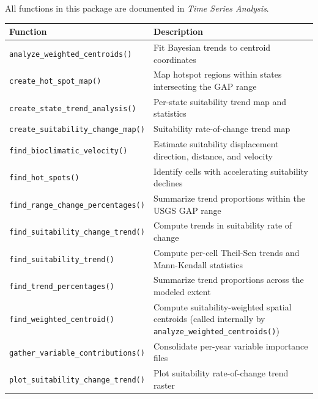 \documentclass[
  letterpaper,
  DIV=11,
  numbers=noendperiod]{scrartcl}
\newcounter{none} %
\begin{document}
All functions in this package are documented in \emph{Time Series
Analysis}.

{\def\LTcaptype{none} %
\begin{longtable}[]{@{}
  >{\raggedright\arraybackslash}p{}
  >{\raggedright\arraybackslash}p{}@{}}
\toprule\noalign{}
\begin{minipage}[b]{\linewidth}\raggedright
Function
\end{minipage} & \begin{minipage}[b]{\linewidth}\raggedright
Description
\end{minipage} \\
\midrule\noalign{}
\endhead
\bottomrule\noalign{}
\endlastfoot
\texttt{analyze\_weighted\_centroids()} & Fit Bayesian trends to
centroid coordinates \\
\texttt{create\_hot\_spot\_map()} & Map hotspot regions within states
intersecting the GAP range \\
\texttt{create\_state\_trend\_analysis()} & Per-state suitability trend
map and statistics \\
\texttt{create\_suitability\_change\_map()} & Suitability rate-of-change
trend map \\
\texttt{find\_bioclimatic\_velocity()} & Estimate suitability
displacement direction, distance, and velocity \\
\texttt{find\_hot\_spots()} & Identify cells with accelerating
suitability declines \\
\texttt{find\_range\_change\_percentages()} & Summarize trend
proportions within the USGS GAP range \\
\texttt{find\_suitability\_change\_trend()} & Compute trends in
suitability rate of change \\
\texttt{find\_suitability\_trend()} & Compute per-cell Theil-Sen trends
and Mann-Kendall statistics \\
\texttt{find\_trend\_percentages()} & Summarize trend proportions across
the modeled extent \\
\texttt{find\_weighted\_centroid()} & Compute suitability-weighted
spatial centroids (called internally by
\texttt{analyze\_weighted\_centroids()}) \\
\texttt{gather\_variable\_contributions()} & Consolidate per-year
variable importance files \\
\texttt{plot\_suitability\_change\_trend()} & Plot suitability
rate-of-change trend raster \\

\end{longtable}}
\end{document}
